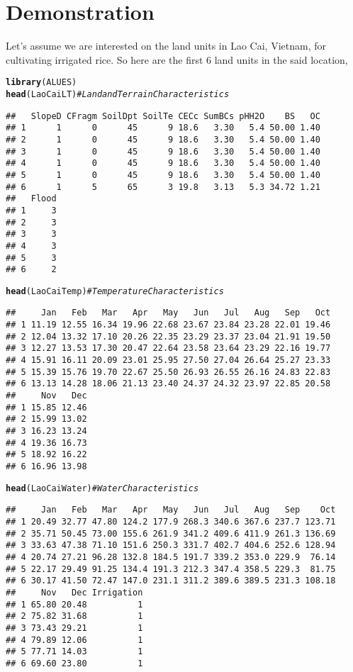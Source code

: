 \documentclass[11pt,fleqn]{article}\usepackage[]{graphicx}\usepackage[]{color}
\makeatletter
\newcommand{\hlcom}[1]{\textcolor[rgb]{0.678,0.584,0.686}{\textit{#1}}}%
\newcommand{\hlstd}[1]{\textcolor[rgb]{0.345,0.345,0.345}{#1}}%
\newcommand{\hlkwd}[1]{\textcolor[rgb]{0.737,0.353,0.396}{\textbf{#1}}}%
\newenvironment{kframe}{%
 \def\at@end@of@kframe{}%
 \ifinner\ifhmode%
  \def\at@end@of@kframe{\end{minipage}}%
  \begin{minipage}{\columnwidth}%
 \fi\fi%
 \def\FrameCommand##1{\hskip\@totalleftmargin \hskip-\fboxsep
 \colorbox{shadecolor}{##1}\hskip-\fboxsep
     \hskip-\linewidth \hskip-\@totalleftmargin \hskip\columnwidth}%
 \MakeFramed {\advance\hsize-\width
   \@totalleftmargin\z@ \linewidth\hsize
   \@setminipage}}%
 {\par\unskip\endMakeFramed%
 \at@end@of@kframe}
\newenvironment{knitrout}{}{} %
\makeatother
\begin{document}
\section{Demonstration}
Let's assume we are interested on the land units in Lao Cai, Vietnam, for cultivating irrigated rice. So here are the first 6 land units in the said location,
\begin{knitrout}
\color{fgcolor}\begin{kframe}
\begin{alltt}
\hlkwd{library}\hlstd{(ALUES)}
\hlkwd{head}\hlstd{(LaoCaiLT)} \hlcom{# Land and Terrain Characteristics}
\end{alltt}
\begin{verbatim}
##   SlopeD CFragm SoilDpt SoilTe CECc SumBCs pHH2O    BS   OC
## 1      1      0      45      9 18.6   3.30   5.4 50.00 1.40
## 2      1      0      45      9 18.6   3.30   5.4 50.00 1.40
## 3      1      0      45      9 18.6   3.30   5.4 50.00 1.40
## 4      1      0      45      9 18.6   3.30   5.4 50.00 1.40
## 5      1      0      45      9 18.6   3.30   5.4 50.00 1.40
## 6      1      5      65      3 19.8   3.13   5.3 34.72 1.21
##   Flood
## 1     3
## 2     3
## 3     3
## 4     3
## 5     3
## 6     2
\end{verbatim}
\begin{alltt}
\hlkwd{head}\hlstd{(LaoCaiTemp)} \hlcom{# Temperature Characteristics}
\end{alltt}
\begin{verbatim}
##     Jan   Feb   Mar   Apr   May   Jun   Jul   Aug   Sep   Oct
## 1 11.19 12.55 16.34 19.96 22.68 23.67 23.84 23.28 22.01 19.46
## 2 12.04 13.32 17.10 20.26 22.35 23.29 23.37 23.04 21.91 19.50
## 3 12.27 13.53 17.30 20.47 22.64 23.58 23.64 23.29 22.16 19.77
## 4 15.91 16.11 20.09 23.01 25.95 27.50 27.04 26.64 25.27 23.33
## 5 15.39 15.76 19.70 22.67 25.50 26.93 26.55 26.16 24.83 22.83
## 6 13.13 14.28 18.06 21.13 23.40 24.37 24.32 23.97 22.85 20.58
##     Nov   Dec
## 1 15.85 12.46
## 2 15.99 13.02
## 3 16.23 13.24
## 4 19.36 16.73
## 5 18.92 16.22
## 6 16.96 13.98
\end{verbatim}
\begin{alltt}
\hlkwd{head}\hlstd{(LaoCaiWater)} \hlcom{# Water Characteristics}
\end{alltt}
\begin{verbatim}
##     Jan   Feb   Mar   Apr   May   Jun   Jul   Aug   Sep    Oct
## 1 20.49 32.77 47.80 124.2 177.9 268.3 340.6 367.6 237.7 123.71
## 2 35.71 50.45 73.00 155.6 261.9 341.2 409.6 411.9 261.3 136.69
## 3 33.63 47.38 71.10 151.6 250.3 331.7 402.7 404.6 252.6 128.94
## 4 20.74 27.21 96.28 132.8 184.5 191.7 339.2 353.0 229.9  76.14
## 5 22.17 29.49 91.25 134.4 191.3 212.3 347.4 358.5 229.3  81.75
## 6 30.17 41.50 72.47 147.0 231.1 311.2 389.6 389.5 231.3 108.18
##     Nov   Dec Irrigation
## 1 65.80 20.48          1
## 2 75.82 31.68          1
## 3 73.43 29.21          1
## 4 79.89 12.06          1
## 5 77.71 14.03          1
## 6 69.60 23.80          1
\end{verbatim}
\end{kframe}
\end{knitrout}
\end{document}
